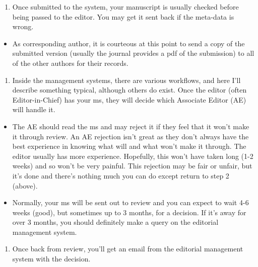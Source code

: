 \documentclass[
]{krantz}
\providecommand{\tightlist}{%
  \setlength{\itemsep}{0pt}\setlength{\parskip}{0pt}}
\begin{document}
\begin{enumerate}
\def\labelenumi{\arabic{enumi}.}
\tightlist
\item
  Once submitted to the system, your manuscript is usually checked before being passed to the editor. You may get it sent back if the meta-data is wrong.
\end{enumerate}

\begin{itemize}
\tightlist
\item
  As corresponding author, it is courteous at this point to send a copy of the submitted version (usually the journal provides a pdf of the submission) to all of the other authors for their records.
\end{itemize}

\begin{enumerate}
\def\labelenumi{\arabic{enumi}.}
\tightlist
\item
  Inside the management systems, there are various workflows, and here I'll describe something typical, although others do exist. Once the editor (often Editor-in-Chief) has your ms, they will decide which Associate Editor (AE) will handle it.
\end{enumerate}

\begin{itemize}
\tightlist
\item
  The AE should read the ms and may reject it if they feel that it won't make it through review. An AE rejection isn't great as they don't always have the best experience in knowing what will and what won't make it through. The editor usually has more experience. Hopefully, this won't have taken long (1-2 weeks) and so won't be very painful. This rejection may be fair or unfair, but it's done and there's nothing much you can do except return to step 2 (above).
\item
  Normally, your ms will be sent out to review and you can expect to wait 4-6 weeks (good), but sometimes up to 3 months, for a decision. If it's away for over 3 months, you should definitely make a query on the editorial management system.
\end{itemize}

\begin{enumerate}
\def\labelenumi{\arabic{enumi}.}
\tightlist
\item
  Once back from review, you'll get an email from the editorial management system with the decision.
\end{enumerate}
\end{document}
